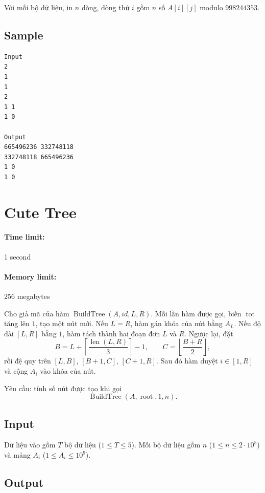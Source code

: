 \documentclass[11pt]{article}
\begin{document}
Với mỗi bộ dữ liệu, in \(n\) dòng, dòng thứ \(i\) gồm \(n\) số
\(A[i][j]\) modulo \(998244353\).

\subsection*{Sample}

\begin{verbatim}
Input
2
1
1
2
1 1
1 0

Output
665496236 332748118
332748118 665496236
1 0
1 0
\end{verbatim}

\section{Cute Tree}

\paragraph{Time limit:} 1 second
\paragraph{Memory limit:} 256 megabytes

Cho giả mã của hàm \(\operatorname{BuildTree}(A,id,L,R)\). Mỗi lần hàm được
gọi, biến \(\operatorname{tot}\) tăng lên \(1\), tạo một nút mới. Nếu
\(L=R\), hàm gán khóa của nút bằng \(A_L\). Nếu độ dài \([L,R]\) bằng \(1\),
hàm tách thành hai đoạn đơn \(L\) và \(R\). Ngược lại, đặt
\[
  B=L+\left\lceil\frac{\operatorname{len}(L,R)}{3}\right\rceil-1,\qquad
  C=\left\lfloor\frac{B+R}{2}\right\rfloor,
\]
rồi đệ quy trên \([L,B]\), \([B+1,C]\), \([C+1,R]\). Sau đó hàm duyệt
\(i\in[1,R]\) và cộng \(A_i\) vào khóa của nút.

Yêu cầu: tính số nút được tạo khi gọi
\[
  \operatorname{BuildTree}(A,\operatorname{root},1,n).
\]

\subsection*{Input}

Dữ liệu vào gồm \(T\) bộ dữ liệu (\(1\le T\le 5\)). Mỗi bộ dữ liệu gồm
\(n\) (\(1\le n\le 2\cdot 10^5\)) và mảng \(A_i\)
(\(1\le A_i\le 10^9\)).

\subsection*{Output}
\end{document}
